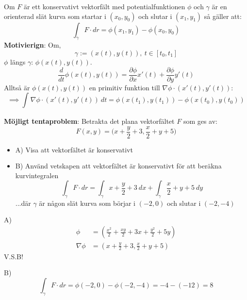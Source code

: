 \documentclass{report}
\begin{document}
{
Om $ F $ är ett konservativt vektorfält med potentialfunktionen $ \phi  $ och $ \gamma $ är en orienterad slät kurva som startar i $ (x_0, y_0) $ och slutar i $ (x_1, y_1) $ så gäller att:
\begin{equation*}
\int_{ \gamma}^{} F \cdot dr = \phi ( x_1, y_1 ) - \phi (x_0, y_0) 
\end{equation*}
\textbf{Motivierign}: Om,
\begin{equation*}
	\gamma := (x(t), y(t)), \: t \in [t_0, t_1]
\end{equation*}
$ \phi  $ längs $ \gamma $: $ \phi (x(t), y(t)) $.
\begin{equation*}
\frac{d}{dt} \phi (x(t), y(t)) = \frac{\partial \phi  }{\partial x } x'(t) + \frac{\partial \phi  }{\partial y } y'(t)
\end{equation*}
Alltså är $ \phi (x(t), y(t)) $ en primitiv funktion till $ \nabla \phi \cdot (x'(t),y'(t)) $:
\begin{equation*}
\implies \int_{}^{} \nabla \phi \cdot (x'(t),y'(t)) \: dt = \phi (x(t_1),y(t_1))- \phi (x(t_0), y(t_0)) 
\end{equation*}
}

\qs{}
{
\textbf{Möjligt tentaproblem}:
Betrakta det plana vektorfältet $ F $ som ges av:
\begin{equation*}
F(x,y) = \bigl( x+ \frac{y}{2} +3, \frac{x}{2} +y+5 \bigr)
\end{equation*}
\begin{itemize}
	\item A) Visa att vektorfältet är konservativt
	\item B) Använd vetskapen att vektorfältet är konservativt för att beräkna kurvintegralen
	\begin{equation*}
	\int_{ \gamma}^{} F \cdot dr = \int_{ \gamma}^{} x+  \frac{y}{2} + 3 \: dx + \int_{ \gamma}^{} \frac{x}{2} +y+5 \: dy   
	\end{equation*}
	...där $ \gamma $ är någon slät kurva som börjar i $ (-2,0) $ och slutar i $ (-2,-4) $ 
\end{itemize}
}
\sol A)
\begin{align*}
	\phi &= ( \frac{x^2}{2} + \frac{xy}{2} + 3x + \frac{y^2}{2} +5y)\\
	\nabla \phi &= (x+ \frac{y}{2} +3, \frac{x}{2}  + y + 5)
\end{align*}
V.S.B!

\sol B)
\begin{equation*}
\int_{ \gamma}^{} F \cdot dr = \phi (-2,0) - \phi (-2,-4) = -4-(-12) = 8 
\end{equation*}
\end{document}
